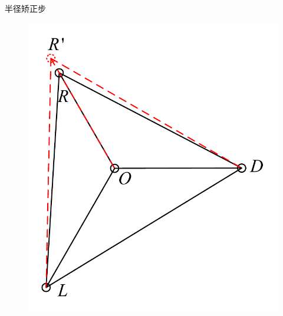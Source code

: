 \documentclass[aspectratio=169]{beamer}
\begin{document}
\begin{frame}{半径矫正步}
\begin{figure}[!ht]
\begin{minipage}[t]{0.3\textwidth}
            \includegraphics[width=\textwidth]{图片/半径矫正步2.pdf}
        \end{minipage}
    \end{figure}
\end{frame}
\end{document}
